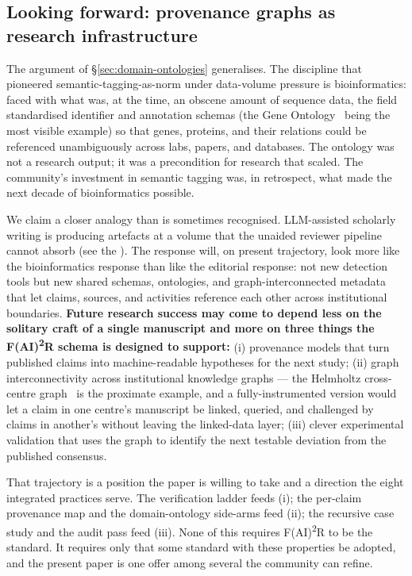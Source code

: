 \subsection{Looking forward: provenance graphs as research infrastructure}
\label{sec:research-infrastructure}

The argument of \S\ref{sec:domain-ontologies} generalises. The
discipline that pioneered semantic-tagging-as-norm under
data-volume pressure is bioinformatics: faced with what was, at the
time, an obscene amount of sequence data, the field standardised
identifier and annotation schemas (the Gene
Ontology~\cite{ashburner2000go} being the most
visible example) so that genes, proteins, and their relations could
be referenced unambiguously across labs, papers, and databases. The
ontology was not a research output; it was a precondition for
research that scaled. The community's investment in semantic
tagging was, in retrospect, what made the next decade of
bioinformatics possible.

We claim a closer analogy than is sometimes recognised. LLM-assisted
scholarly writing is producing artefacts at a volume that the
unaided reviewer pipeline cannot absorb (see the ). The
response will, on present trajectory, look more like the
bioinformatics response than like the editorial response: not new
detection tools but new shared schemas, ontologies, and
graph-interconnected metadata that let claims, sources, and
activities reference each other across institutional boundaries.
\textbf{Future research success may come to depend less on the
solitary craft of a single manuscript and more on three things the
F(AI)\textsuperscript{2}R schema is designed to support:} (i)
provenance models that turn published claims into machine-readable
hypotheses for the next study; (ii) graph interconnectivity across
institutional knowledge graphs --- the Helmholtz cross-centre
graph~\cite{curdt2025hmc} is the proximate example, and a
fully-instrumented version would let a claim in one centre's
manuscript be linked, queried, and challenged by claims in another's
without leaving the linked-data layer; (iii) clever experimental
validation that uses the graph to identify the next testable
deviation from the published consensus.

That trajectory is a position the paper is willing to take and a
direction the eight integrated practices serve. The verification
ladder feeds (i); the per-claim provenance map and the
domain-ontology side-arms feed (ii); the recursive case study and
the audit pass feed (iii). None of this requires F(AI)\textsuperscript{2}R
to be the standard. It requires only that some standard with these
properties be adopted, and the present paper is one offer among
several the community can refine.
